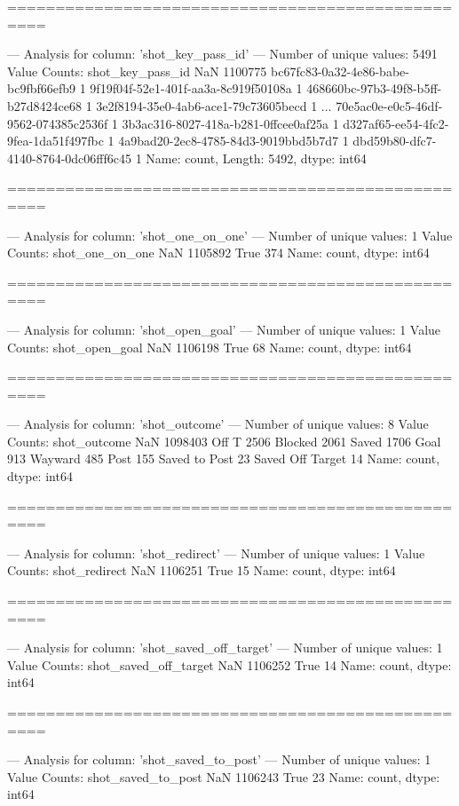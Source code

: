 ==================================================

--- Analysis for column: 'shot_key_pass_id' ---
Number of unique values: 5491
Value Counts:
shot_key_pass_id
NaN                                     1100775
bc67fc83-0a32-4e86-babe-bc9fbf66efb9          1
9f19f04f-52e1-401f-aa3a-8c919f50108a          1
468660bc-97b3-49f8-b5ff-b27d8424ce68          1
3e2f8194-35e0-4ab6-ace1-79c73605becd          1
                                         ...   
70e5ac0e-e0c5-46df-9562-074385c2536f          1
3b3ac316-8027-418a-b281-0ffcee0af25a          1
d327af65-ee54-4fc2-9fea-1da51f497fbc          1
4a9bad20-2ec8-4785-84d3-9019bbd5b7d7          1
dbd59b80-dfc7-4140-8764-0dc06fff6c45          1
Name: count, Length: 5492, dtype: int64

==================================================

--- Analysis for column: 'shot_one_on_one' ---
Number of unique values: 1
Value Counts:
shot_one_on_one
NaN     1105892
True        374
Name: count, dtype: int64

==================================================

--- Analysis for column: 'shot_open_goal' ---
Number of unique values: 1
Value Counts:
shot_open_goal
NaN     1106198
True         68
Name: count, dtype: int64

==================================================

--- Analysis for column: 'shot_outcome' ---
Number of unique values: 8
Value Counts:
shot_outcome
NaN                 1098403
Off T                  2506
Blocked                2061
Saved                  1706
Goal                    913
Wayward                 485
Post                    155
Saved to Post            23
Saved Off Target         14
Name: count, dtype: int64

==================================================

--- Analysis for column: 'shot_redirect' ---
Number of unique values: 1
Value Counts:
shot_redirect
NaN     1106251
True         15
Name: count, dtype: int64

==================================================

--- Analysis for column: 'shot_saved_off_target' ---
Number of unique values: 1
Value Counts:
shot_saved_off_target
NaN     1106252
True         14
Name: count, dtype: int64

==================================================

--- Analysis for column: 'shot_saved_to_post' ---
Number of unique values: 1
Value Counts:
shot_saved_to_post
NaN     1106243
True         23
Name: count, dtype: int64

